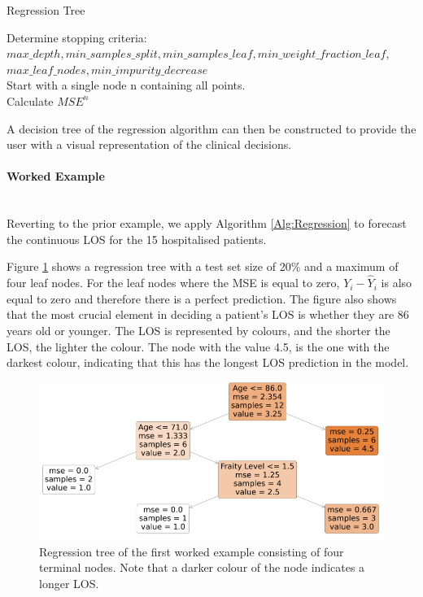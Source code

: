 \documentclass[../thesis.tex]{subfiles}
\begin{document}
\begin{algorithm}
\caption{Regression Tree}\label{Alg:Regression}
Determine stopping criteria:\\ $max\_depth, min\_samples\_split, min\_samples\_leaf, min\_weight\_fraction\_leaf,$\\$ max\_leaf\_nodes, min\_impurity\_decrease$\\
Start with a single node n containing all points. \\
Calculate $MSE^{n}$\\
\end{algorithm}

A decision tree of the regression algorithm can then be constructed to provide the user with a visual representation of the clinical decisions.

\paragraph{Worked Example}\\
Reverting to the prior example, we apply Algorithm \ref{Alg:Regression} to forecast the continuous LOS for the 15 hospitalised patients. 

Figure \ref{fig:RegTree1} shows a regression tree with a test set size of 20\% and a maximum of four leaf nodes. For the leaf nodes where the MSE is equal to zero, $Y_{i} - \hat Y_{i}$ is also equal to zero and therefore there is a perfect prediction. The figure also shows that the most crucial element in deciding a patient's LOS is whether they are 86 years old or younger. The LOS is represented by colours, and the shorter the LOS, the lighter the colour. The node with the value 4.5, is the one with the darkest colour, indicating that this has the longest LOS prediction in the model.

\begin{figure}
    \centering
    \includegraphics[scale = 0.8]{Chapters/Chapter3/Figures/RegTree1.png}
    \caption{Regression tree of the first worked example consisting of four terminal nodes. Note that a darker colour of the node indicates a longer LOS.}
    \label{fig:RegTree1}
\end{figure}
\end{document}
